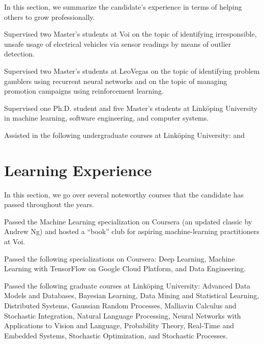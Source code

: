 \documentclass[journal]{IEEEtran}
\begin{document}
In this section, we summarize the candidate's experience in terms of helping
others to grow professionally.

\date{2022} Supervised two Master's students at Voi on the topic of identifying
irresponsible, unsafe usage of electrical vehicles via sensor readings by means
of outlier detection.

\date{2018--2019} Supervised two Master's students at LeoVegas on the topic of
identifying problem gamblers using recurrent neural networks and on the topic of
managing promotion campaigns using reinforcement learning.

\date{2011--2017} Supervised one Ph.D. student and five Master's students at
Linköping University in machine learning, software engineering, and computer
systems.

\date{2011--2017} Assisted in the following undergraduate courses at Linköping
University:  
 and

\section{Learning Experience} 

In this section, we go over several noteworthy courses that the candidate has
passed throughout the years.

\date{2022} Passed the Machine Learning specialization on Coursera (an updated
classic by Andrew Ng) and hosted a ``book'' club for aspiring machine-learning
practitioners at Voi.

\date{2018--2019} Passed the following specializations on Coursera: Deep
Learning, Machine Learning with TensorFlow on Google Cloud Platform, and Data
Engineering.

\date{2011--2017} Passed the following graduate courses at Linköping University:
Advanced Data Models and Databases, Bayesian Learning, Data Mining and
Statistical Learning, Distributed Systems, Gaussian Random Processes, Malliavin
Calculus and Stochastic Integration, Natural Language Processing, Neural
Networks with Applications to Vision and Language, Probability Theory, Real-Time
and Embedded Systems, Stochastic Optimization, and Stochastic Processes.
\end{document}
